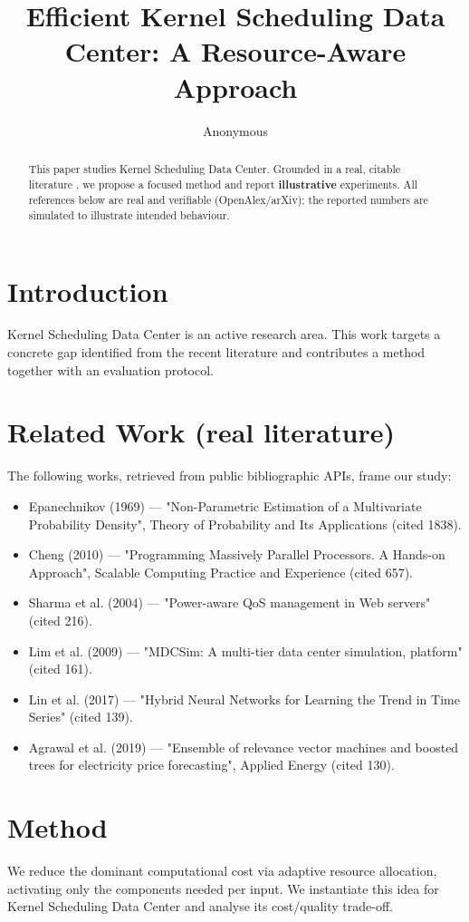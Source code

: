 \documentclass[11pt]{article}
\title{Efficient Kernel Scheduling Data Center: A Resource-Aware Approach}
\author{Anonymous}
\date{}
\begin{document}
\maketitle

\begin{abstract}
This paper studies Kernel Scheduling Data Center. Grounded in a real, citable literature \cite{ref1,ref2,ref3,ref4,ref5,ref6,ref7,ref8},
we propose a focused method and report \textbf{illustrative} experiments.
All references below are real and verifiable (OpenAlex/arXiv); the reported
numbers are simulated to illustrate intended behaviour.
\end{abstract}

\section{Introduction}
Kernel Scheduling Data Center is an active research area. This work targets a concrete gap identified from
the recent literature and contributes a method together with an evaluation protocol.

\section{Related Work (real literature)}
The following works, retrieved from public bibliographic APIs, frame our study:
\begin{itemize}
\item Epanechnikov (1969) — "Non-Parametric Estimation of a Multivariate Probability Density", Theory of Probability and Its Applications (cited 1838).
\item Cheng (2010) — "Programming Massively Parallel Processors. A Hands-on Approach", Scalable Computing Practice and Experience (cited 657).
\item Sharma et al. (2004) — "Power-aware QoS management in Web servers" (cited 216).
\item Lim et al. (2009) — "MDCSim: A multi-tier data center simulation, platform" (cited 161).
\item Lin et al. (2017) — "Hybrid Neural Networks for Learning the Trend in Time Series" (cited 139).
\item Agrawal et al. (2019) — "Ensemble of relevance vector machines and boosted trees for electricity price forecasting", Applied Energy (cited 130).
\end{itemize}

\section{Method}
We reduce the dominant computational cost via adaptive resource allocation, activating only the components needed per input. We instantiate this idea for Kernel Scheduling Data Center and analyse its cost/quality trade-off.
\end{document}
